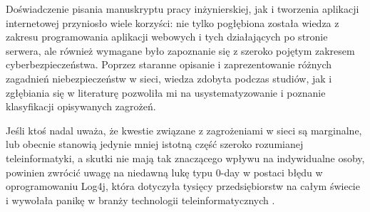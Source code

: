 \documentclass[12pt,twoside]{article}
\begin{document}
Doświadczenie pisania manuskryptu pracy inżynierskiej, jak i tworzenia aplikacji internetowej przyniosło wiele korzyści: nie tylko pogłębiona została wiedza z zakresu programowania aplikacji webowych i tych działających po stronie serwera, ale również wymagane było zapoznanie się z szeroko pojętym zakresem cyberbezpieczeństwa. Poprzez staranne opisanie i zaprezentowanie różnych zagadnień niebezpieczeństw w sieci, wiedza zdobyta podczas studiów, jak i zgłębiania się w literaturę pozwoliła mi na usystematyzowanie i poznanie klasyfikacji opisywanych zagrożeń. 

Jeśli ktoś nadal uważa, że kwestie związane z zagrożeniami w sieci są marginalne, lub obecnie stanowią jedynie mniej istotną część szeroko rozumianej teleinformatyki, a skutki nie mają tak znaczącego wpływu na indywidualne osoby, powinien zwrócić uwagę na niedawną lukę typu 0-day w postaci błędu w oprogramowaniu Log4j, która dotyczyła tysięcy przedsiębiorstw na całym świecie i wywołała panikę w branży technologii teleinformatycznych \cite{Log4j}.

\clearpage

\end{document}
